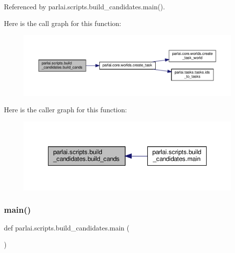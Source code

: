 Referenced by parlai.\+scripts.\+build\+\_\+candidates.\+main().

Here is the call graph for this function\+:
\nopagebreak
\begin{figure}[H]
\begin{center}
\leavevmode
\includegraphics[width=350pt]{namespaceparlai_1_1scripts_1_1build__candidates_a7932b774b6e77c36347f89f3d79c676e_cgraph}
\end{center}
\end{figure}
Here is the caller graph for this function\+:
\nopagebreak
\begin{figure}[H]
\begin{center}
\leavevmode
\includegraphics[width=335pt]{namespaceparlai_1_1scripts_1_1build__candidates_a7932b774b6e77c36347f89f3d79c676e_icgraph}
\end{center}
\end{figure}
\mbox{\label{namespaceparlai_1_1scripts_1_1build__candidates_a99ffd6743adcd4a6f0f5a26418d21a3a}} 
\subsubsection{\texorpdfstring{main()}{main()}}
{\footnotesize\ttfamily def parlai.\+scripts.\+build\+\_\+candidates.\+main (\begin{DoxyParamCaption}{ }\end{DoxyParamCaption})}



